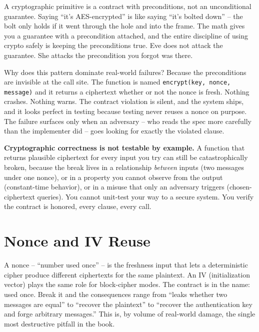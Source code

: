\begin{intuitionbox}
A cryptographic primitive is a contract with preconditions, not an unconditional guarantee. Saying ``it's AES-encrypted'' is like saying ``it's bolted down'' -- the bolt only holds if it went through the hole and into the frame. The math gives you a guarantee with a precondition attached, and the entire discipline of using crypto safely is keeping the preconditions true. Eve does not attack the guarantee. She attacks the precondition you forgot was there.
\end{intuitionbox}

Why does this pattern dominate real-world failures? Because the preconditions are invisible at the call site. The function is named \texttt{encrypt(key, nonce, message)} and it returns a ciphertext whether or not the nonce is fresh. Nothing crashes. Nothing warns. The contract violation is silent, and the system ships, and it looks perfect in testing because testing never reuses a nonce on purpose. The failure surfaces only when an adversary -- who reads the spec more carefully than the implementer did -- goes looking for exactly the violated clause.

\begin{focusbox}
\textbf{Cryptographic correctness is not testable by example.} A function that returns plausible ciphertext for every input you try can still be catastrophically broken, because the break lives in a relationship \emph{between} inputs (two messages under one nonce), or in a property you cannot observe from the output (constant-time behavior), or in a misuse that only an adversary triggers (chosen-ciphertext queries). You cannot unit-test your way to a secure system. You verify the contract is honored, every clause, every call.
\end{focusbox}

\section{Nonce and IV Reuse}
\label{ch38:nonce-reuse}

A nonce -- ``number used once'' -- is the freshness input that lets a deterministic cipher produce different ciphertexts for the same plaintext. An IV (initialization vector) plays the same role for block-cipher modes. The contract is in the name: used once. Break it and the consequences range from ``leaks whether two messages are equal'' to ``recover the plaintext'' to ``recover the authentication key and forge arbitrary messages.'' This is, by volume of real-world damage, the single most destructive pitfall in the book.

